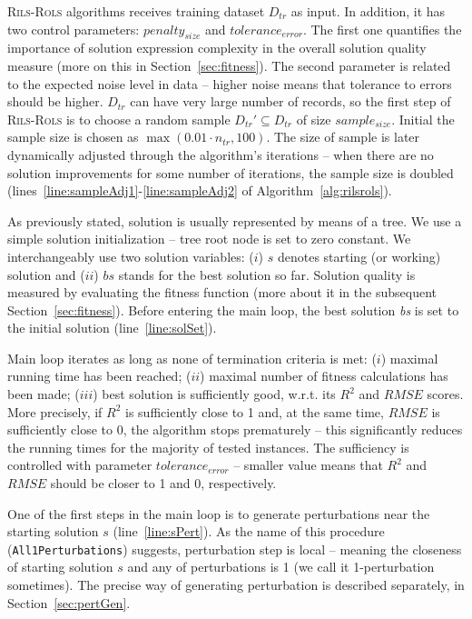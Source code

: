 \documentclass[a4paper,12pt]{elsarticle}
\begin{document}
\textsc{Rils}-\textsc{Rols}  algorithms receives training dataset $D_{tr}$ as input. In addition, it has two control parameters: $penalty_{size}$ and $tolerance_{error}$. The first one quantifies the importance of solution expression complexity in the overall solution quality measure (more on this in Section~\ref{sec:fitness}). The second parameter is related to the expected noise level in data -- higher noise means that tolerance to errors should be higher.
$D_{tr}$ can have very large number of records, so the first step of \textsc{Rils}-\textsc{Rols}  is to choose a random sample $D_{tr}' \subseteq D_{tr}$ of size $sample_{size}$. Initial the sample size is chosen as $\max(0.01 \cdot n_{tr}, 100)$. The size of sample is later dynamically adjusted through the algorithm's iterations -- when there are no solution improvements for some number of iterations, the sample size is doubled (lines~\ref{line:sampleAdj1}-\ref{line:sampleAdj2} of Algorithm~\ref{alg:rilsrols}).

As previously stated, solution is usually represented by means of a tree. We use a simple solution initialization -- tree root node is set to zero constant. We interchangeably use two solution variables: ($i$) $s$ denotes starting (or working) solution and ($ii$) $bs$ stands for the best solution so far. Solution quality is measured by evaluating the fitness function (more about it in the subsequent Section~\ref{sec:fitness}). Before entering the main loop, the best solution \emph{bs} is set to the initial solution (line~\ref{line:solSet}). 


Main loop iterates as long as none of termination criteria is met: ($i$) maximal running time has been reached; ($ii$) maximal number of fitness calculations has been made; ($iii$) best solution is sufficiently good, 
w.r.t. its $R^2$ and $RMSE$ scores. More precisely, if $R^2$ is sufficiently close to 1 and, at the same time, $RMSE$ is sufficiently close to 0, the algorithm stops prematurely -- this significantly reduces the running times for the majority of tested instances.
The sufficiency is controlled with parameter $tolerance_{error}$ -- smaller value means that $R^2$ and $RMSE$ should be closer to 1 and 0, respectively. 


One of the first steps in the main loop is to generate perturbations near the starting solution $s$ (line~\ref{line:sPert}). 
As the name of this procedure (\texttt{All1Perturbations}) suggests, perturbation step is local -- meaning the closeness of starting solution $s$ and any of perturbations is 1 (we call it 1-perturbation sometimes). The precise way of generating perturbation is described separately, in Section~\ref{sec:pertGen}. 
 
\end{document}
